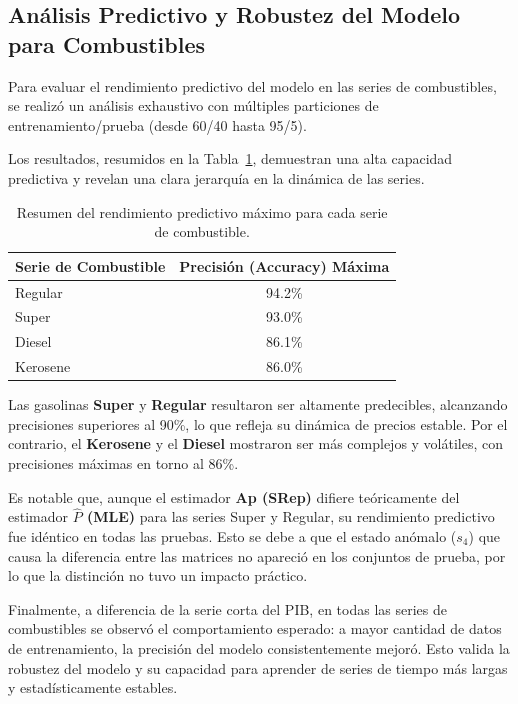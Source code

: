 \subsection{Análisis Predictivo y Robustez del Modelo para Combustibles}
Para evaluar el rendimiento predictivo del modelo en las series de combustibles, se realizó un análisis exhaustivo con múltiples particiones de entrenamiento/prueba (desde 60/40 hasta 95/5).

Los resultados, resumidos en la Tabla~\ref{tab:rendimiento_combustibles}, demuestran una alta capacidad predictiva y revelan una clara jerarquía en la dinámica de las series.

\begin{table}[H]
\centering
\begin{tabular}{lc}
\hline
\textbf{Serie de Combustible} & \textbf{Precisión (Accuracy) Máxima} \\
\hline
Regular & 94.2\% \\
Super   & 93.0\% \\
Diesel  & 86.1\% \\
Kerosene & 86.0\% \\
\hline
\end{tabular}
\caption{Resumen del rendimiento predictivo máximo para cada serie de combustible.}
\label{tab:rendimiento_combustibles}
\end{table}

Las gasolinas \textbf{Super} y \textbf{Regular} resultaron ser altamente predecibles, alcanzando precisiones superiores al 90\%, lo que refleja su dinámica de precios estable. Por el contrario, el \textbf{Kerosene} y el \textbf{Diesel} mostraron ser más complejos y volátiles, con precisiones máximas en torno al 86\%.

Es notable que, aunque el estimador \textbf{Ap (SRep)} difiere teóricamente del estimador \textbf{$\hat{P}$ (MLE)} para las series Super y Regular, su rendimiento predictivo fue idéntico en todas las pruebas. Esto se debe a que el estado anómalo ($s_4$) que causa la diferencia entre las matrices no apareció en los conjuntos de prueba, por lo que la distinción no tuvo un impacto práctico.

Finalmente, a diferencia de la serie corta del PIB, en todas las series de combustibles se observó el comportamiento esperado: a mayor cantidad de datos de entrenamiento, la precisión del modelo consistentemente mejoró. Esto valida la robustez del modelo y su capacidad para aprender de series de tiempo más largas y estadísticamente estables.

